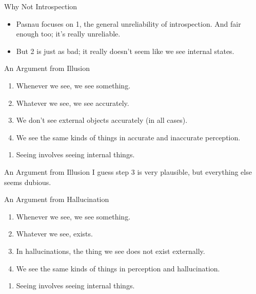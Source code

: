 \documentclass[
  17pt,
  letterpaper,
  ignorenonframetext,
  aspectratio=169,
  handout]{beamer}
\providecommand{\tightlist}{%
  \setlength{\itemsep}{0pt}\setlength{\parskip}{0pt}}\usepackage{longtable,booktabs,array}
\begin{document}
\begin{frame}{Why Not Introspection}
\protect\hypertarget{why-not-introspection}{}
\begin{itemize}[<+->]
\tightlist
\item
  Pasnau focuses on 1, the general unreliability of introspection. And
  fair enough too; it's really unreliable.
\item
  But 2 is just as bad; it really doesn't seem like we see internal
  states.
\end{itemize}
\end{frame}

\begin{frame}{An Argument from Illusion}
\protect\hypertarget{an-argument-from-illusion}{}
\begin{enumerate}[<+->]
\tightlist
\item
  Whenever we see, we see something.
\item
  Whatever we see, we see accurately.
\item
  We don't see external objects accurately (in all cases).
\item
  We see the same kinds of things in accurate and inaccurate perception.
\end{enumerate}

\begin{enumerate}[<+->]
[A.]
\setcounter{enumi}{2}
\tightlist
\item
  Seeing involves seeing internal things.
\end{enumerate}
\end{frame}

\begin{frame}{An Argument from Illusion}
\protect\hypertarget{an-argument-from-illusion-1}{}
I guess step 3 is very plausible, but everything else seems dubious.
\end{frame}

\begin{frame}{An Argument from Hallucination}
\protect\hypertarget{an-argument-from-hallucination}{}
\begin{enumerate}[<+->]
\tightlist
\item
  Whenever we see, we see something.
\item
  Whatever we see, exists.
\item
  In hallucinations, the thing we see does not exist externally.
\item
  We see the same kinds of things in perception and hallucination.
\end{enumerate}

\begin{enumerate}[<+->]
[A.]
\setcounter{enumi}{2}
\tightlist
\item
  Seeing involves seeing internal things.
\end{enumerate}
\end{frame}
\end{document}
